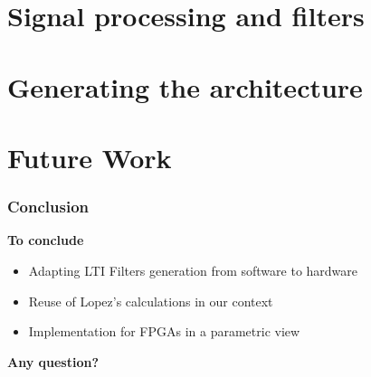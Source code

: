 \documentclass{beamer}
\begin{document}
	
	\section{Signal processing and filters}
	

	\section{Generating the architecture}
	

	\section{Future Work}
	

	\begin{frame}
	\frametitle{Conclusion}
		\begin{center}
			\bfseries
			To conclude
		\end{center}
		\begin{itemize}
			\item Adapting LTI Filters generation from software to hardware
			\item Reuse of Lopez's calculations in our context
			\item Implementation for FPGAs in a parametric view
		\end{itemize}

	\end{frame}

	\begin{frame}
		\begin{center}
			\bfseries
			Any question?
		\end{center}
	\end{frame}

	\bgroup
	\addtocounter{framenumber}{-1}
	\begin{frame}[plain]
	\end{frame}
	
	\egroup
\end{document}
